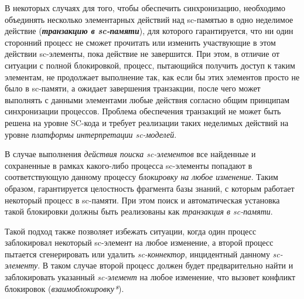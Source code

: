 \begin{SCn}
\begin{scnindent}
\begin{scneqtoset}
\end{scneqtoset}
\end{scnindent}
\end{SCn}

В некоторых случаях для того, чтобы обеспечить синхронизацию, необходимо объединять несколько элементарных действий над sc-памятью в одно неделимое действие (\textbf{\textit{транзакцию в sc-памяти}}), для которого гарантируется, что ни один сторонний процесс не сможет прочитать или изменить участвующие в этом действии sc-элементы, пока действие не завершится. При этом, в отличие от ситуации с полной блокировкой, процесс, пытающийся получить доступ к таким элементам, не продолжает выполнение так, как если бы этих элементов просто не было в sc-памяти, а ожидает завершения транзакции, после чего может выполнять с данными элементами любые действия согласно общим принципам синхронизации процессов. Проблема обеспечения транзакций не может быть решена на уровне SC-кода и требует реализации таких неделимых действий на уровне \textit{платформы интерпретации sc-моделей}.

В случае выполнения \textit{действия поиска sc-элементов} все найденные и сохраненные в рамках какого-либо процесса sc-элементы попадают в соответствующую данному процессу \textit{блокировку на любое изменение}. Таким образом, гарантируется целостность фрагмента базы знаний, с которым работает некоторый процесс в sc-памяти. При этом поиск и автоматическая установка такой блокировки должны быть реализованы как \textit{транзакция в sc-памяти}.
	
Такой подход также позволяет избежать ситуации, когда один процесс заблокировал некоторый sc-элемент на любое изменение, а второй процесс пытается сгенерировать или удалить \textit{sc-коннектор}, инцидентный данному \textit{sc-элементу}. В таком случае второй процесс должен будет предварительно найти и заблокировать указанный \textit{sc-элемент} на любое изменение, что вызовет конфликт блокировок (\textit{взаимоблокировку*}).

